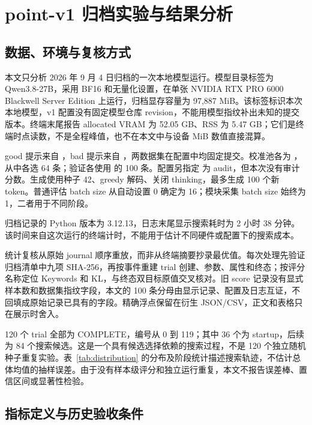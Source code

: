 \section{point-v1 归档实验与结果分析}
\label{sec:experiments}

\subsection{数据、环境与复核方式}

本文只分析 2026 年 9 月 4 日归档的一次本地模型运行\cite{araarchive}。模型目录标签为 Qwen3.8-27B，采用 BF16 和无量化设置，在单张 NVIDIA RTX PRO 6000 Blackwell Server Edition 上运行，归档显存容量为 97,887 MiB。该标签标识本次本地模型，v1 配置没有固定模型仓库 revision，不能用模型指纹补出未知的提交版本。终端末尾报告 allocated VRAM 为 52.05 GB、RSS 为 5.47 GB；它们是终端时点读数，不是全程峰值，也不在本文中与设备 MiB 数值直接混算。

good 提示来自 ，bad 提示来自 ，两数据集在配置中均固定提交。校准池各为 ，从中各选 64 条；验证各使用  的 100 条。配置另指定  为 audit，但本次没有审计分数。生成使用种子 42、greedy 解码、关闭 thinking，最多生成 100 个新 token。普通评估 batch size 从自动设置 0 确定为 16；模块采集 batch size 始终为 1，二者用于不同阶段。

归档记录的 Python 版本为 3.12.13，日志末尾显示搜索耗时为 2 小时 38 分钟。该时间来自这次运行的终端计时，不能用于估计不同硬件或配置下的搜索成本。

统计复核从原始 journal 顺序重放，而非从终端摘要抄录最优值。每次处理先验证归档清单中九项 SHA-256，再按事件重建 trial 创建、参数、属性和终态；按评分名称定位 Keywords 和 KL，与终态双目标原值交叉核对。旧 score 记录没有显式样本数和数据集指纹字段，本文的 100 条分母由显示记录、配置及日志互证，不回填成原始记录已具有的字段。精确浮点保留在衍生 JSON/CSV，正文和表格只在展示时舍入。

120 个 trial 全部为 COMPLETE，编号从 0 到 119；其中 36 个为 startup，后续为 84 个搜索候选。这是一个具有候选选择依赖的搜索过程，不是 120 个独立随机种子重复实验。表~\ref{tab:distribution} 的分布及阶段统计描述搜索轨迹，不估计总体均值的抽样误差。由于没有样本级评分和独立运行重复，本文不报告误差棒、置信区间或显著性检验。

\subsection{指标定义与历史验收条件}

